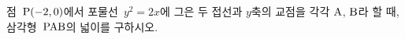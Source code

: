 점~$\mathrm{P}(-2{,}\mkern3mu\mathopen{}0)$에서 포물선~$y^2=2x$에 그은 두 접선과 $y$축의 교점을 각각 $\mathrm{A}$, $\mathrm{B}$라 할 때, 삼각형~$\mathrm{PAB}$의 넓이를 구하시오.
